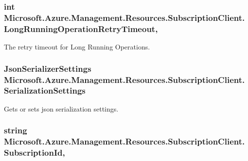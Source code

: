 \subsubsection[{\texorpdfstring{Long\+Running\+Operation\+Retry\+Timeout}{LongRunningOperationRetryTimeout}}]{\setlength{\rightskip}{0pt plus 5cm}int Microsoft.\+Azure.\+Management.\+Resources.\+Subscription\+Client.\+Long\+Running\+Operation\+Retry\+Timeout\hspace{0.3cm}{\ttfamily [get]}, {\ttfamily [set]}}\hypertarget{class_microsoft_1_1_azure_1_1_management_1_1_resources_1_1_subscription_client_a0307675c0c36b17fc4ac0e1b2295c3e4}{}\label{class_microsoft_1_1_azure_1_1_management_1_1_resources_1_1_subscription_client_a0307675c0c36b17fc4ac0e1b2295c3e4}


The retry timeout for Long Running Operations. 

\subsubsection[{\texorpdfstring{Serialization\+Settings}{SerializationSettings}}]{\setlength{\rightskip}{0pt plus 5cm}Json\+Serializer\+Settings Microsoft.\+Azure.\+Management.\+Resources.\+Subscription\+Client.\+Serialization\+Settings\hspace{0.3cm}{\ttfamily [get]}}\hypertarget{class_microsoft_1_1_azure_1_1_management_1_1_resources_1_1_subscription_client_ae80cef67dabf656f811768833fa2d1fa}{}\label{class_microsoft_1_1_azure_1_1_management_1_1_resources_1_1_subscription_client_ae80cef67dabf656f811768833fa2d1fa}


Gets or sets json serialization settings. 

\subsubsection[{\texorpdfstring{Subscription\+Id}{SubscriptionId}}]{\setlength{\rightskip}{0pt plus 5cm}string Microsoft.\+Azure.\+Management.\+Resources.\+Subscription\+Client.\+Subscription\+Id\hspace{0.3cm}{\ttfamily [get]}, {\ttfamily [set]}}\hypertarget{class_microsoft_1_1_azure_1_1_management_1_1_resources_1_1_subscription_client_a0f4b5173b00b37f6f78d31dd9a0ec352}{}\label{class_microsoft_1_1_azure_1_1_management_1_1_resources_1_1_subscription_client_a0f4b5173b00b37f6f78d31dd9a0ec352}


